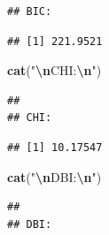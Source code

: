 \documentclass[12pt]{article}
\newenvironment{Shaded}{\begin{snugshade}}{\end{snugshade}}
\newcommand{\FunctionTok}[1]{\textcolor[rgb]{0.13,0.29,0.53}{\textbf{#1}}}
\newcommand{\NormalTok}[1]{#1}
\newcommand{\SpecialCharTok}[1]{\textcolor[rgb]{0.81,0.36,0.00}{\textbf{#1}}}
\newcommand{\StringTok}[1]{\textcolor[rgb]{0.31,0.60,0.02}{#1}}
\begin{document}
\begin{verbatim}
## BIC:
\end{verbatim}

\begin{Shaded}
\end{Shaded}

\begin{verbatim}
## [1] 221.9521
\end{verbatim}

\begin{Shaded}
\begin{Highlighting}[]
\FunctionTok{cat}\NormalTok{(}\StringTok{"}\SpecialCharTok{\textbackslash{}n}\StringTok{CHI:}\SpecialCharTok{\textbackslash{}n}\StringTok{"}\NormalTok{)}
\end{Highlighting}
\end{Shaded}

\begin{verbatim}
## 
## CHI:
\end{verbatim}

\begin{Shaded}
\end{Shaded}

\begin{verbatim}
## [1] 10.17547
\end{verbatim}

\begin{Shaded}
\begin{Highlighting}[]
\FunctionTok{cat}\NormalTok{(}\StringTok{"}\SpecialCharTok{\textbackslash{}n}\StringTok{DBI:}\SpecialCharTok{\textbackslash{}n}\StringTok{"}\NormalTok{)}
\end{Highlighting}
\end{Shaded}

\begin{verbatim}
## 
## DBI:
\end{verbatim}

\begin{Shaded}
\end{Shaded}
\end{document}
